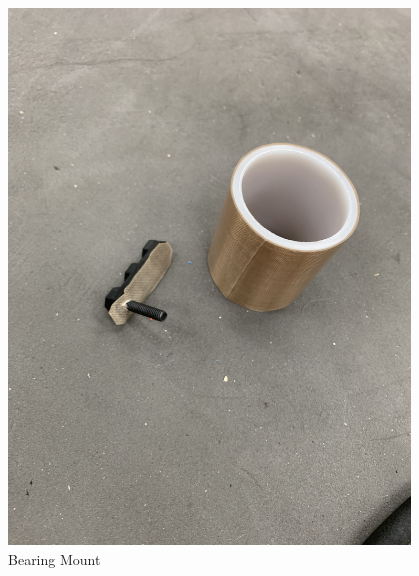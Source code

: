 \begin{figure}[ht]
\begin{minipage}[b]{.48\textwidth}
  \includegraphics[width=0.95\textwidth]{Meetings/August/08-24-21/8-24-21_Hardware_Image4 - Nathan Forrer.JPG}
  \caption{Bearing Mount}
  \label{fig:pic4}
\end{minipage}
\end{figure}